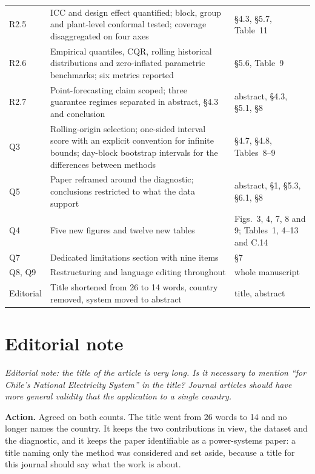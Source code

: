 \documentclass[11pt,a4paper]{article}
\newenvironment{revcomment}
  {\begin{mdframed}[backgroundcolor=quotebg,linecolor=quoterule,linewidth=0.4pt,
    innertopmargin=6pt,innerbottommargin=6pt,skipabove=8pt,skipbelow=8pt]\itshape}
  {\end{mdframed}}
\newcommand{\action}[1]{\textbf{Action.} #1}
\begin{document}
\begin{tabular}{@{}p{}p{}p{}@{}}
R2.5 & ICC and design effect quantified; block, group and plant-level conformal tested; coverage disaggregated on four axes & \S4.3, \S5.7, Table~11 \\
R2.6 & Empirical quantiles, CQR, rolling historical distributions and zero-inflated parametric benchmarks; six metrics reported & \S5.6, Table~9 \\
R2.7 & Point-forecasting claim scoped; three guarantee regimes separated in abstract, \S4.3 and conclusion & abstract, \S4.3, \S5.1, \S8 \\
Q3 & Rolling-origin selection; one-sided interval score with an explicit convention for infinite bounds; day-block bootstrap intervals for the differences between methods & \S4.7, \S4.8, Tables~8--9 \\
Q5 & Paper reframed around the diagnostic; conclusions restricted to what the data support & abstract, \S1, \S5.3, \S6.1, \S8 \\
Q4 & Five new figures and twelve new tables & Figs.~3, 4, 7, 8 and 9; Tables~1, 4--13 and C.14 \\
Q7 & Dedicated limitations section with nine items & \S7 \\
Q8, Q9 & Restructuring and language editing throughout & whole manuscript \\
Editorial & Title shortened from 26 to 14 words, country removed, system moved to abstract & title, abstract \\
\bottomrule
\end{tabular}

\clearpage
\section{Editorial note}

\begin{revcomment}
Editorial note: the title of the article is very long. Is it necessary to mention ``for Chile's National Electricity System'' in the title? Journal articles should have more general validity that the application to a single country.
\end{revcomment}

\action{Agreed on both counts. The title went from 26 words to 14 and no longer names the country. It keeps the two contributions in view, the dataset and the diagnostic, and it keeps the paper identifiable as a power-systems paper: a title naming only the method was considered and set aside, because a title for this journal should say what the work is about.}
\end{document}
